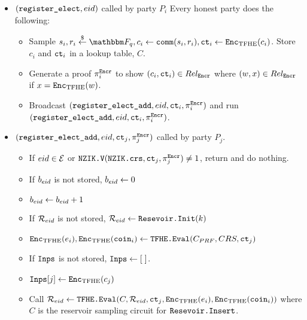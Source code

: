 \begin{mdframed}
\begin{itemize}
		\item $(\texttt{register\_elect}, {eid})$ called by party $P_i$
		      Every honest party does the following:
		      \begin{itemize}
						\item Sample $s_i, r_i \randomGet \F_q, c_i \gets \comm(s_i, r_i), \ct_i \gets \Enc(c_i)$.
						Store $c_i$ and $\texttt{ct}_i$ in a lookup table, $C$.
						\item Generate a proof $\pi_{i}^{\texttt{Encr}}$ to show $(c_i, \texttt{ct}_i) \in Rel_\texttt{Encr}$ where $(w, x) \in Rel_\texttt{Encr}$ if $x = \texttt{Enc}_{\mathrm{TFHE}}(w)$.
						\item Broadcast $(\texttt{register\_elect\_add}, {eid}, \texttt{ct}_i, \pi_{i}^{\texttt{Encr}})$ and run \\$(\texttt{register\_elect\_add}, {eid}, \texttt{ct}_i, \pi_{i}^{\texttt{Encr}})$.
		      \end{itemize}
		
		\item $(\texttt{register\_elect\_add}, {eid}, \texttt{ct}_j, \pi_{j}^{\texttt{Encr}})$ called by party $P_j$.
					\begin{itemize}
			      \item If ${eid} \in \mathcal{E}$ or $\texttt{NZIK.V}(\texttt{NZIK.crs}, \texttt{ct}_j, \pi_{j}^{\texttt{Encr}}) \neq 1$, return and do nothing.
						\item If $b_{eid}$ is not stored, $b_{eid} \gets 0$
						\item $b_{eid} \gets b_{eid} + 1$
						\item If $\mathcal{R}_{eid}$ is not stored, $\mathcal{R}_{eid} \gets \texttt{Resevoir.Init}(k)$
						\item $\texttt{Enc}_{\mathrm{TFHE}}(e_i), \texttt{Enc}_{\mathrm{TFHE}}(\texttt{coin}_i) \gets \texttt{TFHE.Eval}(C_{PRF}, CRS, \texttt{ct}_j)$
			      \item If $\texttt{Inps}$ is not stored, $\texttt{Inps} \gets [\;]$. 
						\item $\texttt{Inps}[j] \gets \texttt{Enc}_{\mathrm{TFHE}}(c_j)$
					  \item Call $\mathcal{R}_{eid} \gets \texttt{TFHE.Eval}(C, \mathcal{R}_{eid}, \texttt{ct}_j, \texttt{Enc}_{\mathrm{TFHE}}(e_i), \texttt{Enc}_{\mathrm{TFHE}}(\texttt{coin}_i))$ where
					        $C$ is the reservoir sampling circuit for $\texttt{Resevoir.Insert}$. %
					\end{itemize}


\end{itemize}
\end{mdframed}
